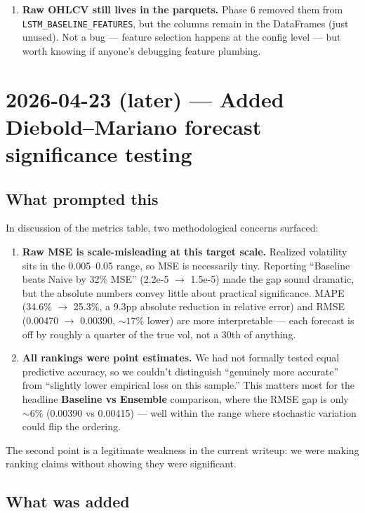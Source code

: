 \documentclass[11pt]{article}
\begin{document}
\begin{enumerate}[leftmargin=*]
  \item \textbf{Raw OHLCV still lives in the parquets.} Phase 6 removed them from \texttt{LSTM\_BASELINE\_FEATURES}, but the columns remain in the DataFrames (just unused). Not a bug --- feature selection happens at the config level --- but worth knowing if anyone's debugging feature plumbing.
\end{enumerate}

\hrulefill

\section*{2026-04-23 (later) --- Added Diebold--Mariano forecast significance testing}

\subsection*{What prompted this}

In discussion of the metrics table, two methodological concerns surfaced:

\begin{enumerate}[leftmargin=*]
  \item \textbf{Raw MSE is scale-misleading at this target scale.} Realized volatility sits in the 0.005--0.05 range, so MSE is necessarily tiny. Reporting ``Baseline beats Naive by 32\% MSE'' (2.2e-5 $\to$ 1.5e-5) made the gap sound dramatic, but the absolute numbers convey little about practical significance. MAPE (34.6\% $\to$ 25.3\%, a 9.3pp absolute reduction in relative error) and RMSE (0.00470 $\to$ 0.00390, ${\sim}17$\% lower) are more interpretable --- each forecast is off by roughly a quarter of the true vol, not a 30th of anything.

  \item \textbf{All rankings were point estimates.} We had not formally tested equal predictive accuracy, so we couldn't distinguish ``genuinely more accurate'' from ``slightly lower empirical loss on this sample.'' This matters most for the headline \textbf{Baseline vs Ensemble} comparison, where the RMSE gap is only ${\sim}6$\% (0.00390 vs 0.00415) --- well within the range where stochastic variation could flip the ordering.
\end{enumerate}

The second point is a legitimate weakness in the current writeup: we were making ranking claims without showing they were significant.

\subsection*{What was added}
\end{document}
